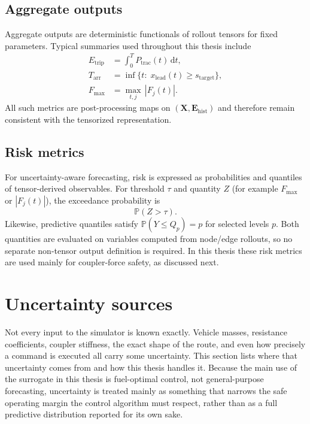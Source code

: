 \subsection{Aggregate outputs}

Aggregate outputs are deterministic functionals of rollout tensors for fixed parameters.
Typical summaries used throughout this thesis include
\begin{align}
    E_{\mathrm{trip}} &= \int_0^{T} P_{\mathrm{trac}}(t)\,\mathrm{d}t, \label{eq:energy} \\
    T_{\mathrm{arr}} &= \inf\{t:\;x_{\mathrm{lead}}(t)\ge s_{\mathrm{target}}\}, \label{eq:arrival_time} \\
    F_{\max} &= \max_{t,j}\,|F_j(t)|.
\end{align}
All such metrics are post-processing maps on $(\mathbf{X},\mathbf{E}_{\mathrm{hist}})$ and therefore remain consistent with the tensorized representation.

\subsection{Risk metrics}
\label{sec:risk_metrics}

For uncertainty-aware forecasting, risk is expressed as probabilities and quantiles of tensor-derived observables.
For threshold $\tau$ and quantity $Z$ (for example $F_{\max}$ or $|F_j(t)|$), the exceedance probability is
\begin{equation}
    \mathbb{P}(Z>\tau).
    \label{eq:exceedance_prob}
\end{equation}
Likewise, predictive quantiles satisfy $\mathbb{P}(Y\le Q_p)=p$ for selected levels $p$.
Both quantities are evaluated on variables computed from node/edge rollouts, so no separate non-tensor output definition is required.
In this thesis these risk metrics are used mainly for coupler-force safety, as discussed next.

\section{Uncertainty sources}
\label{sec:uncertainty_sources}

Not every input to the simulator is known exactly.
Vehicle masses, resistance coefficients, coupler stiffness, the exact shape of the route, and even how precisely a command is executed all carry some uncertainty.
This section lists where that uncertainty comes from and how this thesis handles it.
Because the main use of the surrogate in this thesis is fuel-optimal control, not general-purpose forecasting, uncertainty is treated mainly as something that narrows the safe operating margin the control algorithm must respect, rather than as a full predictive distribution reported for its own sake.

